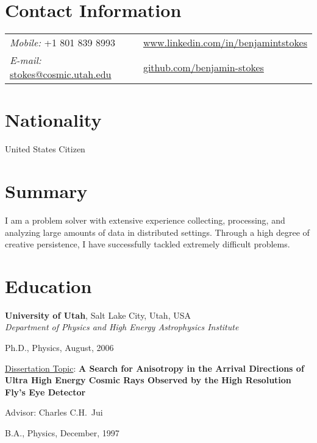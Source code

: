 \begin{resume}
\section{\sc Contact Information}
\vspace{.05in}
\begin{tabular}{@{}p{2.5in}p{2.5in}}
{\it Mobile:}  +1 801 839 8993 & \href{http://www.linkedin.com/in/benjamintstokes}{www.linkedin.com/in/benjamintstokes}\\
{\it E-mail:}  \href{mailto:stokes@cosmic.utah.edu}{stokes@cosmic.utah.edu} & \href{https://github.com/benjamin-stokes}{github.com/benjamin-stokes}\\  

\end{tabular}

\section{\sc Nationality}
United States Citizen 

\section{\sc Summary}
I am a problem solver with extensive experience collecting, processing, and analyzing large amounts of data in distributed settings.  Through a high degree of creative persistence, I have successfully tackled extremely difficult problems.

\section{\sc Education}
{\bf University of Utah}, Salt Lake City, Utah, USA\\
{\em Department of Physics and High Energy Astrophysics Institute} 
\begin{list1}
\item[] Ph.D., Physics, August, 2006
\begin{list2}
\item \href{http://www.cosmic-ray.org/thesis/stokes.html}{Dissertation Topic}: {\bf A Search for Anisotropy in the Arrival Directions of Ultra High Energy Cosmic Rays Observed by the High Resolution Fly's Eye Detector}
\item Advisor:  Charles C.H.\ Jui
\end{list2}
\item[] B.A., Physics, December, 1997
\end{list1}
\vspace*{.05in}


\end{resume}
